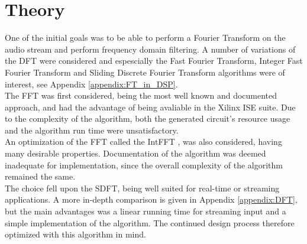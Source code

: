 \section{Theory}

One of the initial goals was to be able to perform a Fourier Transform on the
audio stream and perform frequency domain filtering. A number of variations of
the DFT were considered and espescially the Fast Fourier Transform, Integer Fast
Fourier Transform and Sliding Discrete Fourier Transform algorithms were of
interest, see Appendix \ref{appendix:FT_in_DSP}.\\

The FFT was first considered, being the most well known and documented approach,
and had the advantage of being avaliable in the Xilinx ISE suite. Due to the
complexity of the algorithm, both the generated circuit's resource usage and the
algorithm run time were unsatisfactory.\\

An optimization of the FFT called the IntFFT \cite{oraintara}, was also
considered, having many desirable properties. Documentation of the algorithm was
deemed inadequate for implementation, since the overall complexity of the
algorithm remained the same.\\

The choice fell upon the SDFT\cite{jacobsen03}, being well suited for real-time
or streaming applications. A more in-depth comparison is given in Appendix
\ref{appendix:DFT}, but the main advantages was a linear running time for
streaming input and a simple implementation of the algorithm. The continued
design process therefore optimized with this algorithm in mind.
